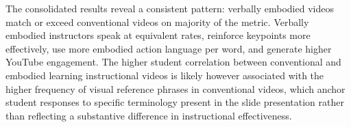 The consolidated results reveal a consistent pattern: verbally embodied videos match or exceed conventional videos on majority of the  metric. Verbally embodied instructors speak at equivalent rates, reinforce keypoints more effectively, use more embodied action language per word, and generate higher YouTube engagement. The  higher student correlation between conventional and embodied learning instructional videos is likely however associated with the higher frequency of visual reference phrases in conventional videos, which anchor student responses to specific terminology present in the slide presentation rather than reflecting a substantive difference in instructional effectiveness.

